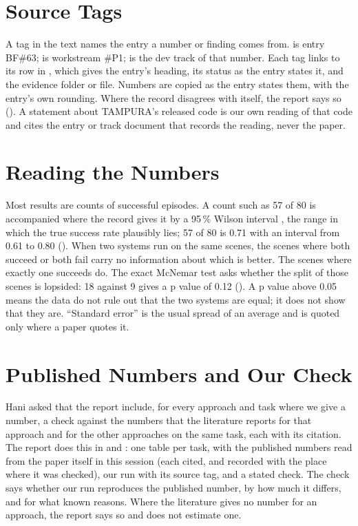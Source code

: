 \section{Source Tags}
\label{sec:tags}

A tag in the text names the entry a number or finding comes from.  is entry
BF\#63;  is workstream \#P1;  is the dev track of that number. Each
tag links to its row in , which gives the entry's
heading, its status as the entry states it, and the evidence folder or file.
Numbers are copied as the entry states them, with the entry's own rounding.
Where the record disagrees with itself, the report says so
(). A statement about TAMPURA's released code is our own
reading of that code and cites the entry or track document that records the
reading, never the paper.

\section{Reading the Numbers}
\label{sec:reading}

Most results are counts of successful episodes. A count such as 57 of 80 is
accompanied where the record gives it by a 95\,\% Wilson interval
\cite{wilson1927probable}, the range in which the true success rate plausibly
lies; 57 of 80 is 0.71 with an interval from 0.61 to 0.80 (). When two
systems run on the same scenes, the scenes where both succeed or both fail
carry no information about which is better. The scenes where exactly one succeeds
do. The exact McNemar test \cite{mcnemar1947note} asks whether the split of
those scenes is lopsided: 18 against 9 gives a p value of 0.12 (). A p value
above 0.05 means the data do not rule out that the two systems are equal; it
does not show that they are. ``Standard error'' is the usual spread of an average
and is quoted only where a paper quotes it.

\section{Published Numbers and Our Check}
\label{sec:check}

Hani asked that the report include, for every approach and task where we give a
number, a check against the numbers that the literature reports for that approach
and for the other approaches on the same task, each with its citation. The report
does this in  and : one table per task, with the published numbers read from
the paper itself in this session (each cited, and recorded with the place where
it was checked), our run with its source tag, and a stated check. The check says
whether our run reproduces the published number, by how much it differs, and for
what known reasons. Where the literature gives no number for an approach, the
report says so and does not estimate one.

